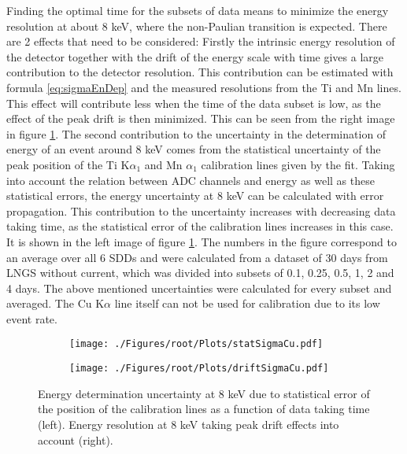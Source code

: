 Finding the optimal time for the subsets of data means to minimize the energy resolution at about 8 keV, where the non-Paulian transition is expected. There are 2 effects that need to be considered: Firstly the intrinsic energy resolution of the detector together with the drift of the energy scale with time gives a large contribution to the detector resolution. This contribution can be estimated with formula \ref{eq:sigmaEnDep} and the measured resolutions from the Ti and Mn lines. This effect will contribute less when the time of the data subset is low, as the effect of the peak drift is then minimized. This can be seen from the right image in figure \ref{fig:sigmaCu}. The second contribution to the uncertainty in the determination of energy of an event around 8 keV comes from the statistical uncertainty of the peak position of the Ti K$\alpha_{1}$ and Mn $\alpha_{1}$ calibration lines given by the fit. Taking into account the relation between ADC channels and energy as well as these statistical errors, the energy uncertainty at 8 keV can be calculated with error propagation. This contribution to the uncertainty increases with decreasing data taking time, as the statistical error of the calibration lines increases in this case. It is shown in the left image of figure \ref{fig:sigmaCu}. The numbers in the figure correspond to an average over all 6 SDDs and were calculated from a dataset of 30 days from LNGS without current, which was divided into subsets of 0.1, 0.25, 0.5, 1, 2 and 4 days. The above mentioned uncertainties were calculated for every subset and averaged. The Cu K$\alpha$ line itself can not be used for calibration due to its low event rate.
\begin{figure}[h]
 \centering
 \begin{subfigure}{.49\textwidth}
 \centering
 \texttt{[image: ./Figures/root/Plots/statSigmaCu.pdf]}
 \end{subfigure}
 \hfill
 \begin{subfigure}{.49\textwidth}
 \centering
 \texttt{[image: ./Figures/root/Plots/driftSigmaCu.pdf]}
 \end{subfigure}
 \caption{Energy determination uncertainty at 8 keV due to statistical error of the position of the calibration lines as a function of data taking time (left). Energy resolution at 8 keV taking peak drift effects into account (right).}
 \label{fig:sigmaCu}
\end{figure}

